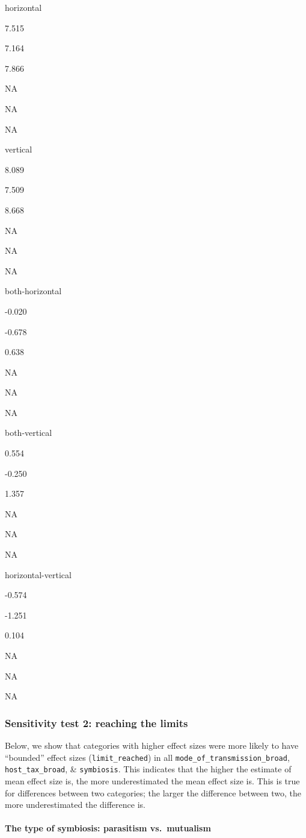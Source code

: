 \documentclass[
]{article}
\begin{document}
horizontal

7.515

7.164

7.866

NA

NA

NA

vertical

8.089

7.509

8.668

NA

NA

NA

both-horizontal

-0.020

-0.678

0.638

NA

NA

NA

both-vertical

0.554

-0.250

1.357

NA

NA

NA

horizontal-vertical

-0.574

-1.251

0.104

NA

NA

NA

\hypertarget{sensitivity-test-2-reaching-the-limits}{%
\subsubsection{Sensitivity test 2: reaching the
limits}\label{sensitivity-test-2-reaching-the-limits}}

Below, we show that categories with higher effect sizes were more likely
to have ``bounded'' effect sizes (\texttt{limit\_reached}) in all
\texttt{mode\_of\_transmission\_broad}, \texttt{host\_tax\_broad}, \&
\texttt{symbiosis}. This indicates that the higher the estimate of mean
effect size is, the more underestimated the mean effect size is. This is
true for differences between two categories; the larger the difference
between two, the more underestimated the difference is.

\hypertarget{the-type-of-symbiosis-parasitism-vs.-mutualism-2}{%
\paragraph{The type of symbiosis: parasitism
vs.~mutualism}\label{the-type-of-symbiosis-parasitism-vs.-mutualism-2}}
\end{document}
